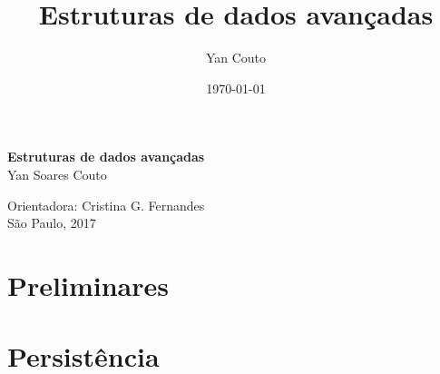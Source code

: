 \documentclass[11pt,oneside,a4paper, openany]{book}
\title{Estruturas de dados avançadas}
\author{Yan Couto}
\date{\today}
\begin{document}
\frontmatter 

\onehalfspacing  %

\thispagestyle{empty}
\begin{center}
	\vspace*{2.3cm}
	\textbf{\huge{Estruturas de dados avançadas}}\\

	\vspace*{1cm}
	\Large{Yan Soares Couto}

	\vskip 1.8cm
	Orientadora: Cristina G. Fernandes\\

	\vspace{\fill}
	\normalsize{São Paulo, 2017}
\end{center}

\setcounter{tocdepth}{1}

\begingroup
\let\cleardoublepage\clearpage
\tableofcontents
\endgroup

\mainmatter
{}

\part{Preliminares}


\part{Persistência}













\end{document}
